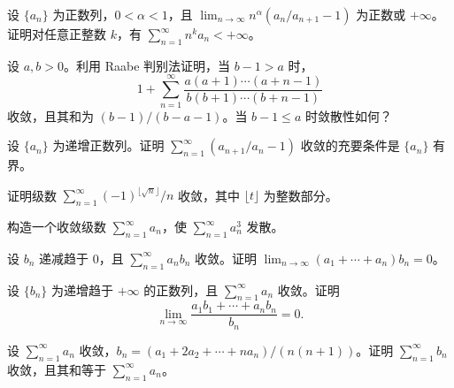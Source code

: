 \noindent\begin{minipage}{\textwidth}
设 $\{a_n\}$ 为正数列，$0<\alpha<1$，且 $\lim_{n\to\infty}n^\alpha(a_n/a_{n+1}-1)$ 为正数或 $+\infty$。证明对任意正整数 $k$，有 $\sum_{n=1}^{\infty}n^ka_n<+\infty$。
\end{minipage}\par\vfill
\newpage
\noindent\begin{minipage}{\textwidth}
设 $a,b>0$。利用 Raabe 判别法证明，当 $b-1>a$ 时，\[1+\sum_{n=1}^{\infty}\frac{a(a+1)\cdots(a+n-1)}{b(b+1)\cdots(b+n-1)}\]收敛，且其和为 $(b-1)/(b-a-1)$。当 $b-1\le a$ 时敛散性如何？
\end{minipage}\par\vfill
\noindent\begin{minipage}{\textwidth}
设 $\{a_n\}$ 为递增正数列。证明 $\sum_{n=1}^{\infty}(a_{n+1}/a_n-1)$ 收敛的充要条件是 $\{a_n\}$ 有界。
\end{minipage}\par\vfill
\noindent\begin{minipage}{\textwidth}
证明级数 $\sum_{n=1}^{\infty}(-1)^{\lfloor\sqrt n\rfloor}/n$ 收敛，其中 $\lfloor t\rfloor$ 为整数部分。
\end{minipage}\par\vfill
\newpage
\noindent\begin{minipage}{\textwidth}
构造一个收敛级数 $\sum_{n=1}^{\infty}a_n$，使 $\sum_{n=1}^{\infty}a_n^3$ 发散。
\end{minipage}\par\vfill
\noindent\begin{minipage}{\textwidth}
设 $b_n$ 递减趋于 $0$，且 $\sum_{n=1}^{\infty}a_nb_n$ 收敛。证明 $\lim_{n\to\infty}(a_1+\cdots+a_n)b_n=0$。
\end{minipage}\par\vfill
\noindent\begin{minipage}{\textwidth}
设 $\{b_n\}$ 为递增趋于 $+\infty$ 的正数列，且 $\sum_{n=1}^{\infty}a_n$ 收敛。证明\[\lim_{n\to\infty}\frac{a_1b_1+\cdots+a_nb_n}{b_n}=0.\]
\end{minipage}\par\vfill
\newpage
\noindent\begin{minipage}{\textwidth}
设 $\sum_{n=1}^{\infty}a_n$ 收敛，$b_n=(a_1+2a_2+\cdots+na_n)/(n(n+1))$。证明 $\sum_{n=1}^{\infty}b_n$ 收敛，且其和等于 $\sum_{n=1}^{\infty}a_n$。
\end{minipage}\par\vfill
